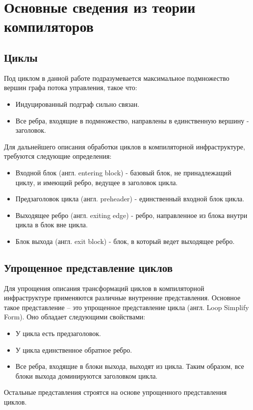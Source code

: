 \chapter{Основные сведения из теории компиляторов}
\label{sec:Chapter1} 

\section{Циклы}

Под циклом\cite{Muchnick_Loops} в данной работе подразумевается максимальное подмножество вершин графа потока управления, такое что:
\begin{itemize}
    \item Индуцированный подграф сильно связан.
    \item Все ребра, входящие в подмножество, направлены в единственную вершину - заголовок.
\end{itemize}

Для дальнейшего описания обработки циклов в компиляторной инфраструктуре, требуются следующие определения:
\begin{itemize}
    \item Входной блок (англ. entering block) - базовый блок, не принадлежащий циклу, и имеющий ребро, ведущее в заголовок цикла.
    \item Предзаголовок цикла (англ. preheader) - единственный входной блок цикла.
    \item Выходящее ребро (англ. exiting edge) - ребро, направленное из блока внутри цикла в блок вне цикла.
    \item Блок выхода (англ. exit block) - блок, в который ведет выходящее ребро.
\end{itemize}

\section{Упрощенное представление циклов}

Для упрощения описания трансформаций циклов в компиляторной инфраструктуре применяются различные внутренние представления.
Основное такое представление -- это упрощенное представление цикла (англ. Loop Simplify Form).
Оно обладает следующими свойствами:
\begin{itemize}
    \item У цикла есть предзаголовок.
    \item У цикла единственное обратное ребро.
    \item Все ребра, входящие в блоки выхода, выходят из цикла. Таким образом, все блоки выхода доминируются заголовком цикла.
\end{itemize}
Остальные представления строятся на основе упрощенного представления циклов.

